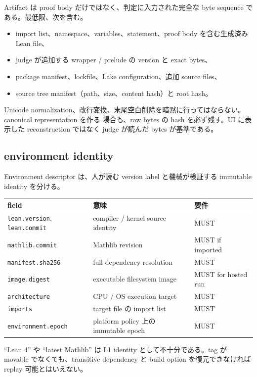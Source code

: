\documentclass[a4paper,11pt]{ltjsarticle}
\newcommand{\code}[1]{\texttt{#1}}
\begin{document}
Artifact は proof body だけではなく、判定に入力された完全な byte sequence である。最低限、次を含む。

\begin{itemize}
  \item import list、namespace、variables、statement、proof body を含む生成済み Lean file、
  \item judge が追加する wrapper / prelude の version と exact bytes、
  \item package manifest、lockfile、Lake configuration、追加 source files、
  \item source tree manifest（path、size、content hash）と root hash。
\end{itemize}

Unicode normalization、改行変換、末尾空白削除を暗黙に行ってはならない。canonical representation を作る
場合も、raw bytes の hash を必ず残す。UI に表示した reconstruction ではなく judge が読んだ bytes が基準である。

\subsection{environment identity}

Environment descriptor は、人が読む version label と機械が検証する immutable identity を分ける。

{\small
\begin{tabularx}{0.96\linewidth}{L{39mm}Y L{29mm}}
\toprule
\textbf{field} & \textbf{意味} & \textbf{要件} \\
\midrule
\code{lean.version}, \code{lean.commit} & compiler / kernel source identity & MUST \\
\code{mathlib.commit} & Mathlib revision & MUST if imported \\
\code{manifest.sha256} & full dependency resolution & MUST \\
\code{image.digest} & executable filesystem image & MUST for hosted run \\
\code{architecture} & CPU / OS execution target & MUST \\
\code{imports} & target file の import list & MUST \\
\code{environment.epoch} & platform policy 上の immutable epoch & MUST \\
\bottomrule
\end{tabularx}}

``Lean 4'' や ``latest Mathlib'' は L1 identity として不十分である。tag が movable でなくても、transitive
dependency と build option を復元できなければ replay 可能とはいえない。
\end{document}
